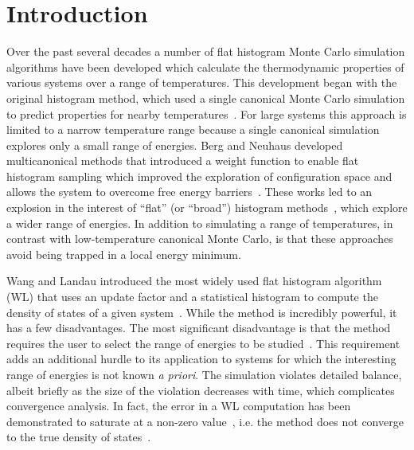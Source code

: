 \documentclass[letterpaper,twocolumn,amsmath,amssymb,pre,aps,10pt]{revtex4-1}
\begin{document}
\section{Introduction}
Over the past several decades a number of flat histogram Monte Carlo simulation
algorithms have been developed which calculate the thermodynamic properties of
various systems over a range of temperatures.  This development began with the
original histogram method, which used a single canonical Monte Carlo simulation
to predict properties for nearby temperatures~\cite{ferrenberg1988new}.  For
large systems this approach is limited to a narrow temperature range because a
single canonical simulation explores only a small range of energies. Berg and
Neuhaus developed multicanonical methods that introduced a weight function to
enable flat histogram sampling which improved the exploration of configuration
space and allows the system to overcome free energy
barriers~\cite{berg1991multicanonical, berg1992multicanonical}. These works led
to an explosion in the interest of ``flat'' (or ``broad'') histogram
methods~\cite{penna1996broad, penna1998broad, swendsen1999transition,
wang2001determining, wang2001efficient, landau2004new, schulz2003avoiding,
yan2003fast, trebst2004optimizing, belardinelli2007wang, belardinelli2007fast,
belardinelli2008analysis, belardinelli2014intrinsic, singh2012density,
zhou2008optimal, schneider2017convergence, liang2006theory, liang2007stochastic,
liang2009improving, werlich2015stochastic, kim2006statistical,
kim2007statistical, kim2009replica, junghans2014molecular}, which explore a
wider range of energies. In addition to simulating a range of temperatures, in
contrast with low-temperature canonical Monte Carlo, is that these approaches
avoid being trapped in a local energy minimum.


Wang and Landau introduced the most widely used flat histogram algorithm (WL)
that uses an update factor and a statistical histogram to compute the density of
states of a given system~\cite{wang2001determining, wang2001efficient}.  While
the method is incredibly powerful, it has a few disadvantages. The most
significant disadvantage is that the method requires the user to select the
range of energies to be studied~\cite{landau2004new, wang2001efficient,
schulz2003avoiding, yan2003fast}. This requirement adds an additional
hurdle to its application to systems for which the interesting range of energies
is not known \emph{a priori}.  The simulation violates detailed balance, albeit
briefly as the size of the violation decreases with time, which complicates
convergence analysis.  In fact, the error in a WL computation has been
demonstrated to saturate at a non-zero value~\cite{yan2003fast}, i.e. the method
does not converge to the true density of states~\cite{belardinelli2007wang,
belardinelli2007fast, belardinelli2008analysis, belardinelli2014intrinsic,
singh2012density, zhou2008optimal}.
\end{document}
